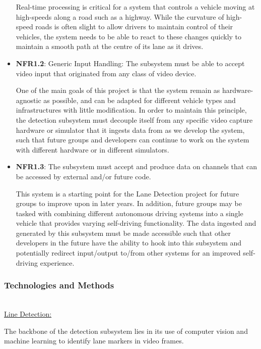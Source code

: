 \documentclass[titlepage,draft]{article}
\begin{document}
\begin{itemize}
	      Real-time processing is critical for a system that controls a vehicle moving at high-speeds along a road such as a highway.
	      While the curvature of high-speed roads is often slight to allow drivers to maintain control of their vehicles, the
	      system needs to be able to react to these changes quickly to maintain a smooth path at the centre of its lane as it drives.
	\item \textbf{NFR1.2}: Generic Input Handling: The subsystem must be able to accept video input that originated from any
	      class of video device.

	      One of the main goals of this project is that the system remain as hardware-agnostic as possible, and can be adapted for
	      different vehicle types and infrastructures with little modification.
	      In order to maintain this principle, the detection subsystem must decouple itself from any specific video capture hardware or
	      simulator that it ingests data from as we develop the system, such that future groups and developers can continue to work
	      on the system with different hardware or in different simulators.
	\item \textbf{NFR1.3}: The subsystem must accept and produce data on channels that can be accessed by external and/or future code.

	      This system is a starting point for the Lane Detection project for future groups to improve upon in later years.
	      In addition, future groups may be tasked with combining different autonomous driving systems into a single vehicle that provides
	      varying self-driving functionality.
	      The data ingested and generated by this subsystem must be made accessible such that other developers in the future have the
	      ability to hook into this subsystem and potentially redirect input/output to/from other systems for an improved self-driving
	      experience.
\end{itemize}


\subsubsection{Technologies and Methods}
~\\
\underline{Line Detection:}

The backbone of the detection subsystem lies in its use of computer vision and machine learning to identify lane markers in video
frames.
\end{document}
